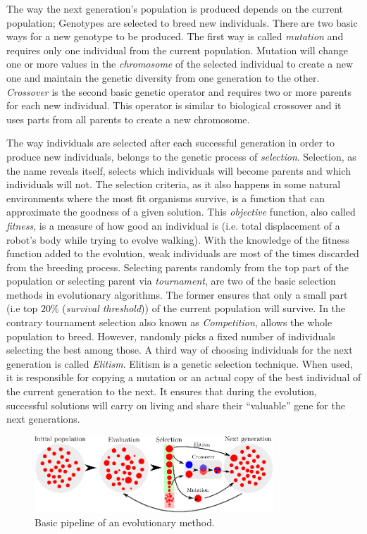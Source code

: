 The way the next generation's population is produced depends on the current population; Genotypes are selected to breed new individuals. There are two basic ways for a new genotype to be produced. The first way is called \emph{mutation} and requires only one individual from the current population. Mutation will change one or more values in the \emph{chromosome} of the selected individual to create a new one and maintain the genetic diversity from one generation to the other. \emph{Crossover} is the second basic genetic operator and requires two or more parents for each new individual. This operator is similar to biological crossover and it uses parts from all parents to create a new chromosome. 


The way individuals are selected after each successful generation in order to produce new individuals, belongs to the genetic process of \emph{selection}. Selection, as the name reveals itself, selects which individuals will become parents and which individuals will not. The selection criteria, as it also happens in some natural environments where the most fit organisms survive, is a function that can approximate the goodness of a given solution. This \emph{objective} function, also called \emph{fitness}, is a measure of how good an individual is (i.e. total displacement of a robot's body while trying to evolve walking). With the knowledge of the fitness function added to the evolution, weak individuals are most of the times discarded from the breeding process. Selecting parents randomly from the top part of the population or selecting parent via \emph{tournament}, are two of the basic selection methods in evolutionary algorithms. The former ensures that only a small part (i.e top $20\%$ ({\it survival threshold})) of the current population will survive. In the contrary tournament selection also known as \emph{Competition}, allows the whole population to breed. However, randomly picks a fixed number of individuals selecting the best among those. A third way of choosing individuals for the next generation is called \emph{Elitism}. Elitism is a genetic selection technique. When used, it is responsible for copying a mutation or an actual copy of the best individual of the current generation to the next. It ensures that during the evolution, successful solutions will carry on living and share their ``valuable'' gene for the next generations.

\begin{figure}[t!]
\vspace{0.4cm} %
\centering
\includegraphics[width=0.8\textwidth]{../Figures/Misc/Evolution.eps}
\caption{Basic pipeline of an evolutionary method.}
\label{fig:evolutionPipeline}
\end{figure}


